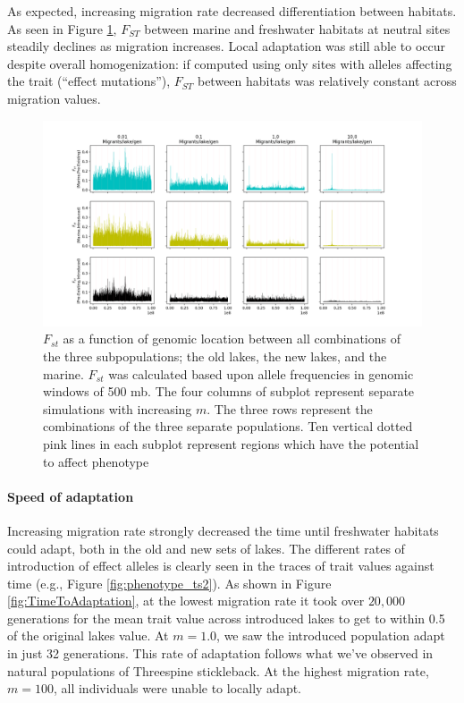 \documentclass{article}
\begin{document}
As expected, increasing migration rate decreased differentiation between habitats.
As seen in Figure \ref{fig:Fst},
$F_{ST}$ between marine and freshwater habitats at neutral sites 
steadily declines as migration increases.
Local adaptation was still able to occur despite overall homogenization:
if computed using only sites with alleles affecting the trait (``effect mutations''),
$F_{ST}$ between habitats was relatively constant across migration values.

\begin{figure}
	\begin{center}
  		\includegraphics[width=1.0\linewidth]{semi_final_plots/Fst_semi_final.png}
  		\caption{
		$F_{st}$ as a function of genomic location between all combinations of the three subpopulations; 
		the old lakes, the new lakes, and the marine.
		$F_{st}$ was calculated based upon allele frequencies in genomic windows of 500 mb. 
		The four columns of subplot represent separate simulations with increasing $m$. 
		The three rows represent the combinations of the three separate populations.
		Ten vertical dotted pink lines in each subplot represent regions which have the potential to affect phenotype
		 }
  		\label{fig:Fst}
	\end{center}
\end{figure}

\paragraph*{Speed of adaptation}
Increasing migration rate strongly decreased the time until freshwater habitats could adapt,
both in the old and new sets of lakes.
The different rates of introduction of effect alleles is clearly seen in the traces
of trait values against time (e.g., Figure \ref{fig:phenotype_ts2}).
As shown in Figure \ref{fig:TimeToAdaptation}, at the lowest migration rate 
it took over $20,000$ generations for the mean trait value across introduced lakes to 
get to within 0.5 of the original lakes value.
At $m = 1.0$, we saw the introduced population adapt in just 32 generations. 
This rate of adaptation follows what we've observed in natural populations of Threespine stickleback.
At the highest migration rate, $m = 100$, all individuals were unable to locally adapt.
\end{document}
